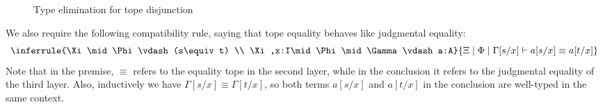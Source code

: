 \documentclass[12pt]{amsart}
\theoremstyle{plain}
\theoremstyle{definition}
\theoremstyle{remark}
\numberwithin{equation}{section}
\newcommand{\jdeq}{\equiv}
\newcommand{\types}{\vdash}
\newcommand{\type}{\;\mathsf{type}}
\newcommand{\rec}{\mathsf{rec}}
\begin{document}
\begin{figure}
  \centering
  \caption{Type elimination for tope disjunction}
  \label{fig:tope-or}
\end{figure}

We also require the following compatibility rule, saying that tope equality behaves like judgmental equality:
\begin{equation}
\inferrule{\Xi\mid\Phi\types (s\jdeq t) \\ \Xi,x:I\mid\Phi\mid\Gamma\types a:A}
{\Xi\mid\Phi\mid\Gamma[s/x] \types a[s/x]\jdeq a[t/x]}\label{eq:tope-eq-jdeq}
\end{equation}
Note that in the premise, $\jdeq$ refers to the equality tope in the second layer, while in the conclusion it refers to the judgmental equality of the third layer.
Also, inductively we have $\Gamma[s/x] \jdeq \Gamma[t/x]$, so both terms $a[s/x]$ and $a[t/x]$ in the conclusion are well-typed in the same context.
\end{document}
